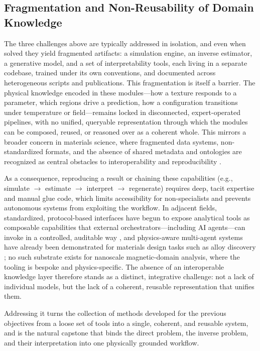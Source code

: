 \documentclass[letterpaper, 12, one column]{article}
\begin{document}
\subsection{Fragmentation and Non-Reusability of Domain Knowledge}

The three challenges above are typically addressed in isolation, and even when solved they yield fragmented artifacts: a simulation engine, an inverse estimator, a generative model, and a set of interpretability tools, each living in a separate codebase, trained under its own conventions, and documented across heterogeneous scripts and publications. This fragmentation is itself a barrier. The physical knowledge encoded in these modules---how a texture responds to a parameter, which regions drive a prediction, how a configuration transitions under temperature or field---remains locked in disconnected, expert-operated pipelines, with no unified, queryable representation through which the modules can be composed, reused, or reasoned over as a coherent whole. This mirrors a broader concern in materials science, where fragmented data systems, non-standardized formats, and the absence of shared metadata and ontologies are recognized as central obstacles to interoperability and reproducibility \cite{brinson2023community,ghiringhelli2023shared}.

As a consequence, reproducing a result or chaining these capabilities (e.g., simulate $\rightarrow$ estimate $\rightarrow$ interpret $\rightarrow$ regenerate) requires deep, tacit expertise and manual glue code, which limits accessibility for non-specialists and prevents autonomous systems from exploiting the workflow. In adjacent fields, standardized, protocol-based interfaces have begun to expose analytical tools as composable capabilities that external orchestrators---including AI agents---can invoke in a controlled, auditable way \cite{hou2025mcp,gridach2025agentic}, and physics-aware multi-agent systems have already been demonstrated for materials design tasks such as alloy discovery \cite{ghafarollahi2024atomagents}; no such substrate exists for nanoscale magnetic-domain analysis, where the tooling is bespoke and physics-specific. The absence of an interoperable knowledge layer therefore stands as a distinct, integrative challenge: not a lack of individual models, but the lack of a coherent, reusable representation that unifies them.

Addressing it turns the collection of methods developed for the previous objectives from a loose set of tools into a single, coherent, and reusable system, and is the natural capstone that binds the direct problem, the inverse problem, and their interpretation into one physically grounded workflow.
\end{document}
